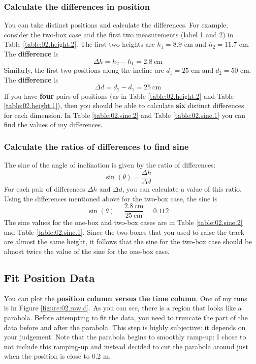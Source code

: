 \subsubsection{Calculate the differences in position}
%
You can take distinct positions and calculate the differences. For example, consider the two-box case and the first two measurements (label 1 and 2) in Table \ref{table:02.height.2}. The first two heights are $h_{1} = 8.9$ cm and $h_{2} = 11.7$ cm. The \textbf{difference} is
\begin{equation}
    \Delta h = h_{2} - h_{1} = 2.8 \ \text{cm}
\end{equation}
Similarly, the first two positions along the incline are $d_{1} = 25$ cm and $d_{2} = 50$ cm. The \textbf{difference} is
\begin{equation}
    \Delta d = d_{2} - d_{1} = 25 \ \text{cm}
\end{equation}
If you have \textbf{four} pairs of positions (as in Table \ref{table:02.height.2} and Table \ref{table:02.height.1}), then you should be able to calculate \textbf{six} distinct differences for each dimension. In Table \ref{table:02.sine.2} and Table \ref{table:02.sine.1} you can find the values of my differences.
%
\subsubsection{Calculate the ratios of differences to find sine}
%
The sine of the angle of inclination is given by the ratio of differences:
\begin{equation}
    \sin(\theta) = \frac{\Delta h}{\Delta d}
\end{equation}
For each pair of differences $\Delta h$ and $\Delta d$, you can calculate a value of this ratio. Using the differences mentioned above for the two-box case, the sine is
\begin{equation}
    \sin(\theta) = \frac{2.8 \ \text{cm}}{25 \ \text{cm}} = 0.112
\end{equation}
The sine values for the one-box and two-box cases are in Table \ref{table:02.sine.2} and Table \ref{table:02.sine.1}. Since the two boxes that you used to raise the track are almost the same height, it follows that the sine for the two-box case should be almost twice the value of the sine for the one-box case.
%
\subsection{Fit Position Data}
%
You can plot the \textbf{position column versus the time column}. One of my runs is in Figure \ref{figure:02.raw.d}. As you can see, there is a region that looks like a parabola. Before attempting to fit the data, you need to truncate the part of the data before and after the parabola. This step is highly subjective: it depends on your judgement. Note that the parabola begins to smoothly ramp-up: I chose to not include this ramping-up and instead decided to cut the parabola around just when the position is close to 0.2 m.

